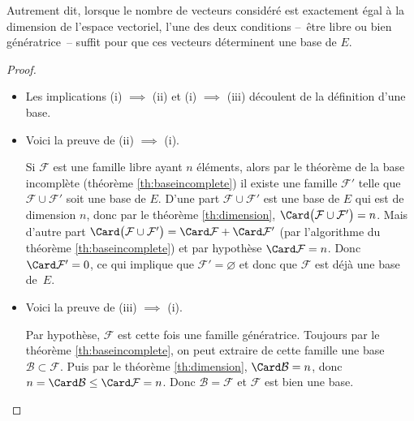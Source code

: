 \documentclass[class=report,crop=false]{standalone}
\begin{document}
Autrement dit, lorsque le nombre de vecteurs considéré est
exactement égal à la dimension de l'espace vectoriel,
l'une des deux conditions --~être libre ou bien génératrice~--
suffit pour que ces vecteurs déterminent une base de $E$.

\begin{proof}
~
\begin{itemize}
  \item Les implications (i) $\implies$ (ii) et
  (i) $\implies$ (iii) découlent de la définition d'une base.


  \item Voici la preuve de (ii) $\implies$ (i).

Si $\mathcal{F}$ est une famille libre ayant $n$ éléments, alors par le théorème de la base incomplète
(théorème \ref{th:baseincomplete}) il existe une famille $\mathcal{F}'$ telle que
$\mathcal{F} \cup \mathcal{F}'$ soit une base de $E$. D'une part
$\mathcal{F} \cup \mathcal{F}'$ est une base de $E$ qui est de dimension $n$, donc
par le théorème \ref{th:dimension}, $\Card \big(\mathcal{F} \cup \mathcal{F}'\big)=n$.
Mais d'autre part $\Card \big(\mathcal{F} \cup \mathcal{F}'\big) = \Card \mathcal{F} + \Card \mathcal{F}'$
(par l'algorithme du théorème \ref{th:baseincomplete}) et par hypothèse
$\Card \mathcal{F}=n$. Donc $\Card \mathcal{F}'=0$, ce qui implique que  $\mathcal{F}'=\varnothing$ et donc que
$\mathcal{F}$ est déjà une base de~$E$.

  \item Voici la preuve de (iii) $\implies$ (i).

Par hypothèse, $\mathcal{F}$ est cette fois une famille génératrice.
Toujours par le théorème \ref{th:baseincomplete},
on peut extraire de cette famille une base $\mathcal{B} \subset \mathcal{F}$.
Puis par le théorème \ref{th:dimension}, $\Card \mathcal{B}=n$, donc
$n = \Card \mathcal{B} \le \Card \mathcal{F}=n$. Donc $\mathcal{B} = \mathcal{F}$ et
$\mathcal{F}$ est bien une base.
\end{itemize}


\end{proof}
\end{document}
